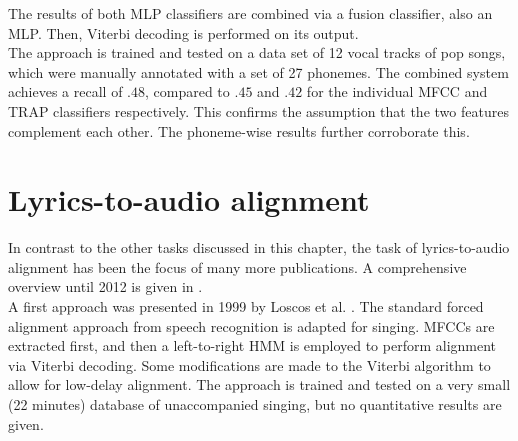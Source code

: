 The results of both MLP classifiers are combined via a fusion classifier, also an MLP. Then, Viterbi decoding is performed on its output.\\
The approach is trained and tested on a data set of 12 vocal tracks of pop songs, which were manually annotated with a set of 27 phonemes. The combined system achieves a recall of $.48$, compared to $.45$ and $.42$ for the individual MFCC and TRAP classifiers respectively. This confirms the assumption that the two features complement each other. The phoneme-wise results further corroborate this.

\section{Lyrics-to-audio alignment}
In contrast to the other tasks discussed in this chapter, the task of lyrics-to-audio alignment has been the focus of many more publications. A comprehensive overview until 2012 is given in \cite{goto_alignment}.\\
A first approach was presented in 1999 by Loscos et al. \cite{Loscos1999}. The standard forced alignment approach from speech recognition is adapted for singing. MFCCs are extracted first, and then a left-to-right HMM is employed to perform alignment via Viterbi decoding. Some modifications are made to the Viterbi algorithm to allow for low-delay alignment. The approach is trained and tested on a very small (22 minutes) database of unaccompanied singing, but no quantitative results are given.\\
